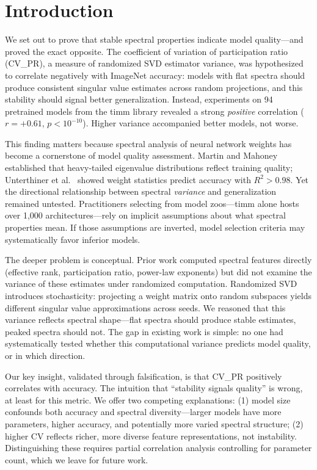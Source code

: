 \section{Introduction}

We set out to prove that stable spectral properties indicate model quality---and proved the exact opposite. The coefficient of variation of participation ratio (CV\_PR), a measure of randomized SVD estimator variance, was hypothesized to correlate negatively with ImageNet accuracy: models with flat spectra should produce consistent singular value estimates across random projections, and this stability should signal better generalization. Instead, experiments on 94 pretrained models from the timm library revealed a strong \emph{positive} correlation ($r = +0.61$, $p < 10^{-10}$). Higher variance accompanied better models, not worse.

This finding matters because spectral analysis of neural network weights has become a cornerstone of model quality assessment. Martin and Mahoney~\cite{martin2019traditional} established that heavy-tailed eigenvalue distributions reflect training quality; Unterthiner et al.~\cite{unterthiner2020predicting} showed weight statistics predict accuracy with $R^2 > 0.98$. Yet the directional relationship between spectral \emph{variance} and generalization remained untested. Practitioners selecting from model zoos---timm alone hosts over 1,000 architectures---rely on implicit assumptions about what spectral properties mean. If those assumptions are inverted, model selection criteria may systematically favor inferior models.

The deeper problem is conceptual. Prior work computed spectral features directly (effective rank, participation ratio, power-law exponents) but did not examine the variance of these estimates under randomized computation. Randomized SVD introduces stochasticity: projecting a weight matrix onto random subspaces yields different singular value approximations across seeds. We reasoned that this variance reflects spectral shape---flat spectra should produce stable estimates, peaked spectra should not. The gap in existing work is simple: no one had systematically tested whether this computational variance predicts model quality, or in which direction.

Our key insight, validated through falsification, is that CV\_PR positively correlates with accuracy. The intuition that ``stability signals quality'' is wrong, at least for this metric. We offer two competing explanations: (1) model size confounds both accuracy and spectral diversity---larger models have more parameters, higher accuracy, and potentially more varied spectral structure; (2) higher CV reflects richer, more diverse feature representations, not instability. Distinguishing these requires partial correlation analysis controlling for parameter count, which we leave for future work.

